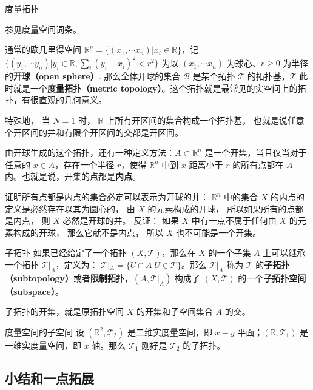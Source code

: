 \begin{example}{度量拓扑}

参见度量空间词条。

通常的欧几里得空间 $\mathbb{R}^n=\{(x_1, \cdots x_n)|x_i\in \mathbb{R}\}$，记 $\{(y_1, \cdots y_n)|y_i\in \mathbb{R}, \sum_i(y_i-x_i)^2< r^2\}$ 为以 $(x_1, \cdots x_n)$ 为球心、$r\geqslant 0$ 为半径的\textbf{开球（open sphere）}. 那么全体开球的集合 $\mathcal{B}$ 是某个拓扑 $\mathcal{T}$ 的拓扑基，$\mathcal{T}$ 此时就是一个\textbf{度量拓扑（metric topology）}。这个拓扑就是最常见的实空间上的拓扑，有很直观的几何意义。

特殊地， 当 $N = 1$ 时， $\mathbb R$ 上所有开区间的集合构成一个拓扑基， 也就是说任意个开区间的并和有限个开区间的交都是开区间。

由开球生成的这个拓扑，还有一种定义方法：$A\subset \mathbb{R}^n$ 是一个开集，当且仅当对于任意的 $x\in A$，存在一个半径 $r$，使得 $\mathbb R^n$ 中到 $x$ 距离小于 $r$ 的所有点都在 $A$ 内。也就是说，开集的点都是\textbf{内点}。

证明所有点都是内点的集合必定可以表示为开球的并： $\mathbb R^n$ 中的集合 $X$ 的内点的定义是必然存在以其为圆心的， 由 $X$ 的元素构成的开球， 所以如果所有的点都是内点， 则 $X$ 必然是开球的并。 反证： 如果 $X$ 中有一点不属于任何由 $X$ 的元素构成的开球， 那么它就不是内点， 所以 $X$ 也不可能是一个开集。
\end{example}

\begin{definition}{子拓扑}\label{def_Topol_3}
如果已经给定了一个拓扑 $(X, \mathcal{T})$，那么在 $X$ 的一个子集 $A$ 上可以继承一个拓扑 $\mathcal{T}|_A$，定义为：
$\mathcal{T}|_A=\{U\cap A|U\in \mathcal{T}\}$。那么 $\mathcal{T}|_A$ 称为 $\mathcal{T}$ 的\textbf{子拓扑（subtopology）}或者\textbf{限制拓扑}，$(A, \mathcal{T}|_A)$ 构成了 $(X, \mathcal{T})$ 的一个\textbf{子拓扑空间（subspace）}。
\end{definition}

子拓扑的开集，就是原拓扑空间 $X$ 的开集和子空间集合 $A$ 的交。

\begin{example}{度量空间的子空间}
设 $(\mathbb{R}^2, \mathcal{T}_2)$ 是二维实度量空间，即 $x-y$ 平面；$(\mathbb{R}, \mathcal{T}_1)$ 是一维实度量空间，即 $x$ 轴。那么 $\mathcal{T}_1$ 刚好是 $\mathcal{T}_2$ 的子拓扑。
\end{example}

\subsection{小结和一点拓展}\label{sub_Topol_1}

